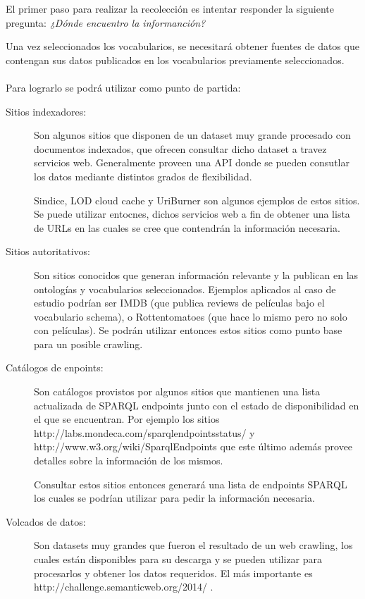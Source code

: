 El primer paso para realizar la recolección es intentar responder la siguiente pregunta: \textit{¿Dónde encuentro la informanción?}

Una vez seleccionados los vocabularios, se necesitará obtener fuentes de datos que contengan sus datos publicados en los vocabularios previamente seleccionados.
 \\\\
Para lograrlo se podrá utilizar como punto de partida:
\begin{description}
\item[Sitios indexadores:] Son algunos sitios que disponen de un dataset muy grande procesado con documentos indexados, que ofrecen consultar dicho 
dataset a travez servicios web. Generalmente proveen una API donde se pueden consutlar los datos mediante distintos grados de flexibilidad.

Sindice, LOD cloud cache y UriBurner son algunos ejemplos de estos sitios. Se puede utilizar entocnes, dichos servicios web a fin
de obtener una lista de URLs en las cuales se cree que contendrán la información necesaria.

\item[Sitios autoritativos:] Son sitios conocidos que generan información relevante y la publican en las ontologías y vocabularios 
seleccionados. Ejemplos aplicados al caso de estudio podrían ser IMDB (que publica reviews de películas bajo el vocabulario schema), o Rottentomatoes
(que hace lo mismo pero no solo con películas). Se podrán utilizar entonces estos sitios como punto base para un posible crawling.

\item[Catálogos de enpoints:] Son catálogos provistos por algunos sitios que mantienen una lista actualizada de SPARQL endpoints 
junto con el estado de disponibilidad en el que se encuentran. Por ejemplo los sitios http://labs.mondeca.com/sparqlendpointsstatus/ y 
http://www.w3.org/wiki/SparqlEndpoints que este último además provee detalles sobre la información de los mismos.

Consultar estos sitios entonces generará una lista de endpoints SPARQL los cuales se podrían utilizar para pedir la información necesaria.

\item[Volcados de datos:] Son datasets muy grandes que fueron el resultado de un web crawling, los cuales están disponibles para su descarga 
y se pueden utilizar para procesarlos y obtener los datos requeridos. El más importante es http://challenge.semanticweb.org/2014/ .
\end{description}
